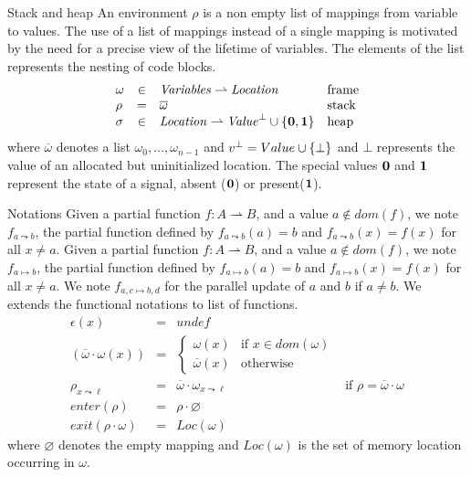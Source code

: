\documentclass[12pt]{article}
\def\present{{\bf{1}}}
\def\absent{{\bf{0}}}
\def\dom{{\mathit{dom}}}
\def\activate{{\mathit{enter}}}
\def\deactivate{{\mathit{exit}}}
\begin{document}
\begin{paragraph}{Stack and heap} An environment $\rho$ is a non empty list of mappings
from variable to values. The use of a list of mappings instead of a single mapping is motivated by the need
for a precise view of the lifetime of variables. The elements of the list represents the nesting of code 
blocks.
$$
\begin{array}{lcll}
\omega &\in& \mathit{Variables} \rightharpoonup \mathit{Location} & {\text{frame}}\\
\rho &=& \overline{\omega} & {\text{stack}}\\
\sigma &\in& \mathit{Location} \rightharpoonup {\mathit{Value}}^\bot \cup\{\absent, \present\} &{\text{heap}}
\end{array}
$$
where $\overline{\omega}$ denotes a list $\omega_0,\ldots,\omega_{n-1}$ and
$v^\bot = Value \cup \{\bot\}$ and $\bot$ represents the value of an allocated but uninitialized location.
The special values $\absent$ and $\present$ represent the state of a signal, absent ($\absent$) or present($\present$). 
\end{paragraph}
\begin{paragraph}{Notations}
Given a partial function $f : A \rightharpoonup B$, and a value $a \not \in \dom(f)$, we note $f_{a \leadsto b}$, the 
partial function defined by $f_{a\leadsto b}(a) = b$ and $f_{a\leadsto b}(x)=f(x)$ for all $x \not = a$.
Given a partial function $f : A \rightharpoonup B$, and a value $a \not \in \dom(f)$, we note $f_{a \mapsto b}$, the 
partial function defined by $f_{a\mapsto b}(a) = b$ and $f_{a\mapsto b}(x)=f(x)$ for all $x \not = a$. We note 
$f_{a,c \mapsto b,d}$ for the parallel update of $a$ and $b$ if $a \not = b$.
We extends the functional notations to list of functions.
$$
  \begin{array}{lcll}
    \epsilon(x) &=& {\mathit{undef}}\\
    (\overline{\omega}\cdot\omega(x)) &=&
    \begin{cases}
      \omega(x) &{\text{if $x \in \dom(\omega)$}}\\
      \overline{\omega}(x)& {\text{otherwise}}
    \end{cases}
    \\
    \rho_{x \leadsto \ell} &=& \overline{\omega} \cdot \omega_{x \leadsto \ell} & {\text{if $\rho = \overline{\omega} \cdot \omega$}}\\
    \activate(\rho) &=& \rho \cdot \varnothing \\
    \deactivate(\rho\cdot\omega) &=& Loc(\omega)
  \end{array}
$$
where $\varnothing$ denotes the empty mapping and $Loc(\omega)$ is 
the set of memory location occurring in $\omega$.
\end{paragraph}
\end{document}
